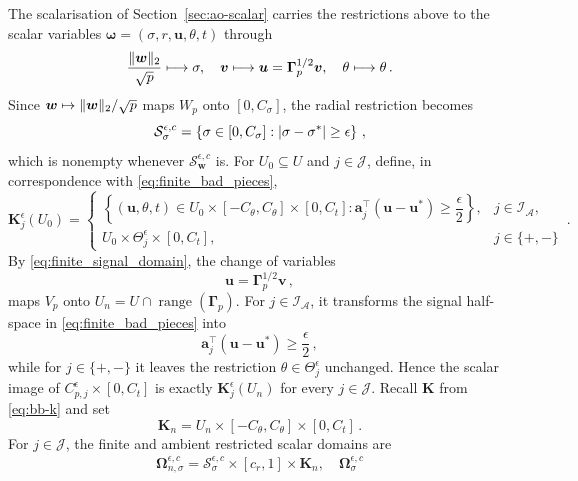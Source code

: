 \documentclass{article}
\makeatletter
\theoremstyle{definition}
\newcommand{\vnorm}[1]{%
	\ensuremath{%
		\if@display
		\left\| #1 \right\|
		\else
		\| #1 \|
		\fi
	}%
}
\newcommand{\abs}[1]{%
	\ensuremath{%
		\if@display
		\left| #1 \right|
		\else
		\lvert #1 \rvert
		\fi
	}%
}
\newcommand*{\bb}{\boldsymbol}
\def\bw {\bb{w}}
\def\bu{\bb{u}}
\def\bv{\bb{v}}
\newcommand{\range}{\operatorname{range}}
\makeatother
\begin{document}
\begin{bibunit}
The scalarisation of Section~\ref{sec:ao-scalar} carries the restrictions
above to the scalar variables $\bb\omega=(\sigma,r,\bu,\theta,t)$ through
$$
\frac{\vnorm{\bw}_2}{\sqrt p}\longmapsto\sigma,
\quad
\bv\longmapsto\bu=\bb\Gamma_p^{1/2}\bv,
\quad
\theta\longmapsto\theta \,.
$$
Since $\bw\mapsto\vnorm{\bw}_2/\sqrt p$ maps $W_p$ onto $[0,C_\sigma]$, the
radial restriction becomes
$$
\mathcal S_{\sigma}^{\epsilon,c}
    =
    \left\{
        \sigma\in[0,C_\sigma]:
        \abs{\sigma-\sigma^*}\geq\epsilon
    \right\}\,,
$$
which is nonempty whenever $\mathcal S_{\bw}^{\epsilon,c}$ is. For
$U_0\subseteq U$ and $j\in\mathcal J$, define, in correspondence
with \eqref{eq:finite_bad_pieces},
\begin{equation}
\label{eq:scalar_bad_pieces}
    \bb K_j^\epsilon(U_0)
    =
    \begin{cases}
        \left\{
            (\bu,\theta,t)
            \in
            U_0\times[-C_\theta,C_\theta]\times[0,C_t]:
            \bb a_j^\top(\bu-\bu^*)
            \geq
            \dfrac{\epsilon}{2}
        \right\},
        & j\in\mathcal I_{\mathcal A},
        \\[3ex]
        U_0\times\Theta_j^\epsilon\times[0,C_t],
        & j\in\{+,-\}
    \end{cases}\,.
\end{equation}
By \eqref{eq:finite_signal_domain}, the change of variables
$$
    \bu
    =
    \bb\Gamma_p^{1/2}\bv\,,
$$
maps $V_p$ onto
$U_n=U\cap\range(\bb\Gamma_p)$. For
$j\in\mathcal I_{\mathcal A}$, it transforms the signal half-space in
\eqref{eq:finite_bad_pieces} into
$$
    \bb a_j^\top(\bu-\bu^*)
    \geq
    \frac{\epsilon}{2}\,,
$$
while for $j\in\{+,-\}$ it leaves the restriction
$\theta\in\Theta_j^\epsilon$ unchanged. Hence the scalar image of
$C_{p,j}^\epsilon\times[0,C_t]$ is exactly
$\bb K_j^\epsilon(U_n)$ for every $j\in\mathcal J$.
Recall $\bb K$ from \eqref{eq:bb-k} and set
$$
    \bb K_n
    =
    U_n\times[-C_\theta,C_\theta]\times[0,C_t] \,.
$$
For $j\in\mathcal J$, the finite and ambient restricted scalar domains are
\begin{equation}
\label{eq:restricted_scalar_domains}
\begin{aligned}
    \bb\Omega_{n,\sigma}^{\epsilon,c}
    =
    \mathcal S_{\sigma}^{\epsilon,c}
    \times[c_r,1]\times\bb K_n,
    \quad
    \bb\Omega_{\sigma}^{\epsilon,c}

\end{aligned}
\end{equation}
\end{bibunit}
\end{document}
